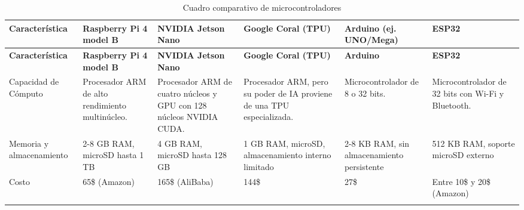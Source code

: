 
{\small
  \begin{longtable}[c]{p{2.2cm} p{2.4cm} p{2.4cm} p{2.4cm} p{2.4cm} p{2.4cm}}
    \hline
    \textbf{Característica}                                                &
    \textbf{Raspberry Pi 4 model B}                                        &
    \textbf{NVIDIA Jetson Nano}                                            &
    \textbf{Google Coral (TPU)}                                            &
    \textbf{Arduino (ej. UNO/Mega)}                                        &
    \textbf{ESP32}                                                           \\
    \hline
    \endfirsthead

    \hline
    \textbf{Característica}                                                &
    \textbf{Raspberry Pi 4 model B}                                        &
    \textbf{NVIDIA Jetson Nano}                                            &
    \textbf{Google Coral (TPU)}                                            &
    \textbf{Arduino}                                                       &
    \textbf{ESP32}                                                           \\
    \hline
    \endhead
    \endfoot
    \endlastfoot

    Capacidad de Cómputo                                                   &
    Procesador ARM de alto rendimiento multinúcleo.                        &
    Procesador ARM de cuatro núcleos y GPU con 128 núcleos NVIDIA CUDA.    &
    Procesador ARM, pero su poder de IA proviene de una TPU especializada. &
    Microcontrolador de 8 o 32 bits.                                       &
    Microcontrolador de 32 bits con Wi-Fi y Bluetooth.                       \\

    \addlinespace
    Memoria y almacenamiento                                               &
    2-8 GB RAM, microSD hasta 1 TB                                         &
    4 GB RAM, microSD hasta 128 GB                                         &
    1 GB RAM, microSD, almacenamiento interno limitado                     &
    2-8 KB RAM, sin almacenamiento persistente                             &
    512 KB RAM, soporte microSD externo                                      \\
    \addlinespace
    Costo                                                                  &
    65\$ (Amazon)                                                          &
    165\$ (AliBaba)                                                        &
    144\$                                                                  &
    27\$                                                                   &
    Entre 10\$ y 20\$ (Amazon)
    \\
    \hline
    \caption{Cuadro comparativo de microcontroladores}
    \label{tab:cuadro_comparativo_microcontroladores}
  \end{longtable}
}



